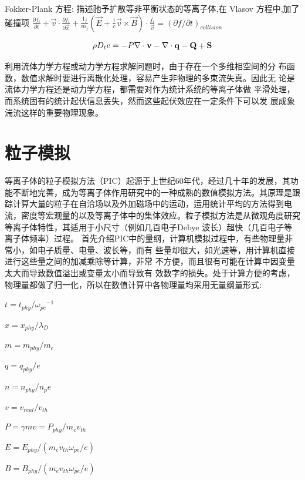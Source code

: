 Fokker-Plank 方程:
描述驰予扩散等非平衡状态的等离子体,在 Vlasov 方程中,加了碰撞项
$\frac{\partial{f_i}}{\partial{t}} + \vec{v} \cdot \frac{\partial{f_i}}{\partial{\vec{x}}} + \frac{1_j}{m_j}(\vec{E}+\frac{1}{c} \vec{v} \times \vec{B}) \cdot \frac{f_i}{\vec{v}}=(\partial{f}/\partial{t})_{collision}$

\begin{equation}
\label{eqn:energyCon}
\rho D_t e = -P \nabla \cdot \bf{v} - \nabla \cdot \bf{q} -Q +S
\end{equation} 

利用流体力学方程或动力学方程求解问题时，由于存在一个多维相空间的分
布函数，数值求解时要进行离散化处理，容易产生非物理的多束流失真。因此无
论是流体力学方程还是动力学方程，都需要对作为统计系统的等离子体做
平滑处理，而系统固有的统计起伏信息丢失，然而这些起伏效应在一定条件下可以发
展成象湍流这样的重要物理现象。



\section{粒子模拟}



等离子体的粒子模拟方法（PIC）起源于上世纪60年代，经过几十年的发展，其功能不断地完善，成为等离子体作用研究中的一种成熟的数值模拟方法。其原理是跟踪计算大量的粒子在自洽场以及外加磁场中的运动，运用统计平均的方法得到电流，密度等宏观量的以及等离子体中的集体效应。粒子模拟方法是从微观角度研究等离子体特性，其适用于小尺寸（例如几百电子Debye 波长）超快（几百电子等离子体频率）过程。 首先介绍PIC中的量纲，计算机模拟过程中，有些物理量非常小，如电子质量、电量、波长等，而有
些量却很大，如光速等，用计算机直接进行这些量之间的加减乘除等计算，非常
不方便，而且很有可能在计算中因变量太大而导致数值溢出或变量太小而导致有
效数字的损失。处于计算方便的考虑，物理量都做了归一化，所以在数值计算中各物理量均采用无量纲量形式:


  $t=t_{phy}/{{\omega}_{pe}}^{-1}$
  
  $x=x_{phy}/ {\lambda}_{D}$
  
  $m=m_{phy}/m_e$

  $q=q_{phy}/e$

  $n=n_{phy}/n_pe$

  $v=v_{real}/{v_{th}}$
  
  $P=\gamma mv =P_{phy}/{m_e v_{th}}$
  
  $E=E_{phy}/(m_e v_{th} \omega_{pe} /e )$
  
  $B=B_{phy}/(m_e v_{th} \omega_{pe} /e )$
  
